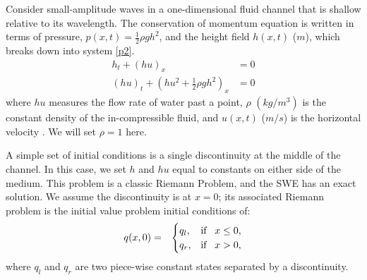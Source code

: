 \documentclass[10pt,a4paper]{article}
\begin{document}
		Consider small-amplitude waves in a one-dimensional fluid channel that is shallow relative to its wavelength. The conservation of momentum equation is written in terms of pressure, $p(x,t) = \frac{1}{2}\rho gh^{2}$, and the height field $h(x,t)$ ($m$), which breaks down into system \eqref{p2}.
	\begin{equation}
		\begin{aligned}
			h_{t} + (hu)_x &= 0 \\
			(hu)_t + \left(hu^{2} + \frac{1}{2}\rho gh^{2} \right)_x & = 0 
		\end{aligned}
		\label{p2}
	\end{equation}	
	where $hu$ measures the flow rate of water past a point,  $\rho$ $(kg/m^{3})$ is the constant density of the in-compressible fluid, and $u(x,t)$ ($m/s$) is the horizontal velocity  \cite{leveque2002finite,toro2001shock}.  We will set $\rho = 1$ here.
	
	A simple set of initial conditions is a single discontinuity at the middle of the channel.  In this case, we set $h$ and $hu$ equal to constants on either side of the medium.  This problem is a classic Riemann Problem, and the SWE has an exact solution.  We assume the discontinuity is at $x = 0$; its associated Riemann problem is the initial value problem initial conditions of:
		\begin{eqnarray}
		q(x,0)& =& \begin{cases}
			q_{l}, & \text{if \, $x \le 0,$}\\
			q_{r},& \text{if \, $x > 0,$}\\
			
		\end{cases}  
		\label{rp1}     
	\end{eqnarray}
where $q_{l}$ and $q_{r}$ are two piece-wise constant states separated by a discontinuity. 
\end{document}
